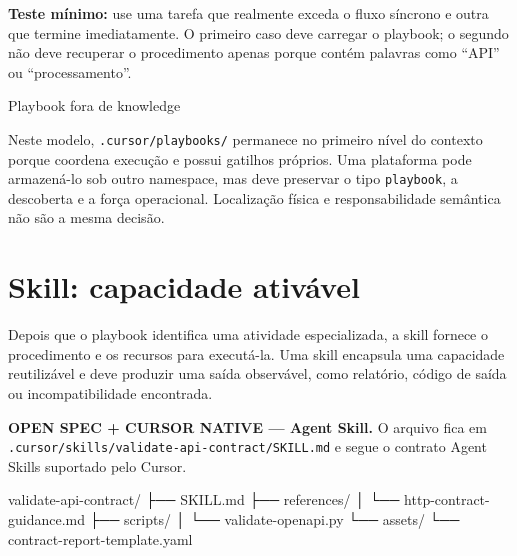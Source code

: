 \documentclass[
  10pt,
  a4paper,
  oneside]{book}
\newenvironment{Shaded}{}{}
\newcommand{\NormalTok}[1]{#1}
\begin{document}
\textbf{Teste mínimo:} use uma tarefa que realmente exceda o fluxo
síncrono e outra que termine imediatamente. O primeiro caso deve
carregar o playbook; o segundo não deve recuperar o procedimento apenas
porque contém palavras como ``API'' ou ``processamento''.

\begin{infobox}{Playbook fora de knowledge}

Neste modelo, \texttt{.cursor/playbooks/} permanece no primeiro nível do
contexto porque coordena execução e possui gatilhos próprios. Uma
plataforma pode armazená-lo sob outro namespace, mas deve preservar o
tipo \texttt{playbook}, a descoberta e a força operacional. Localização
física e responsabilidade semântica não são a mesma decisão.

\end{infobox}

\hypertarget{skill-capacidade-ativuxe1vel}{%
\section{Skill: capacidade
ativável}\label{skill-capacidade-ativuxe1vel}}

Depois que o playbook identifica uma atividade especializada, a skill
fornece o procedimento e os recursos para executá-la. Uma skill
encapsula uma capacidade reutilizável e deve produzir uma saída
observável, como relatório, código de saída ou incompatibilidade
encontrada.

\textbf{OPEN SPEC + CURSOR NATIVE --- Agent Skill.} O arquivo fica em
\texttt{.cursor/skills/validate-api-contract/SKILL.md} e segue o
contrato Agent Skills suportado pelo Cursor.

\begin{Shaded}
\begin{Highlighting}[]
\NormalTok{validate{-}api{-}contract/}
\NormalTok{├── SKILL.md}
\NormalTok{├── references/}
\NormalTok{│   └── http{-}contract{-}guidance.md}
\NormalTok{├── scripts/}
\NormalTok{│   └── validate{-}openapi.py}
\NormalTok{└── assets/}
\NormalTok{    └── contract{-}report{-}template.yaml}
\end{Highlighting}
\end{Shaded}
\end{document}
